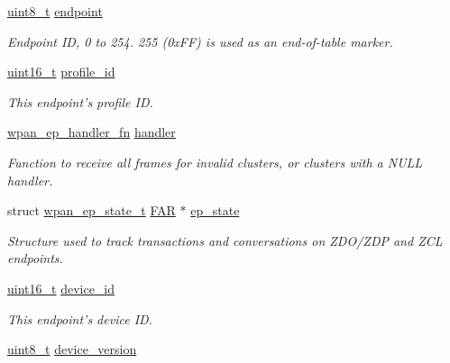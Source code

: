 \begin{DoxyCompactItemize}
\item 
\hypertarget{group__wpan__aps_ga7d397493728da2bca8d55b2d61c4ec5d}{\hyperlink{group__hal_gae1affc9ca37cfb624959c866a73f83c2}{uint8\-\_\-t} \hyperlink{group__wpan__aps_ga7d397493728da2bca8d55b2d61c4ec5d}{endpoint}}\label{group__wpan__aps_ga7d397493728da2bca8d55b2d61c4ec5d}

\begin{DoxyCompactList}\small\item\em Endpoint I\-D, 0 to 254. 255 (0x\-F\-F) is used as an end-\/of-\/table marker. \end{DoxyCompactList}\item 
\hyperlink{group__hal_ga5a8b2dc9e45a9ee81a94ef304fb62505}{uint16\-\_\-t} \hyperlink{group__wpan__aps_ga5ca7f19e5697de2baf0e2147a41a5792}{profile\-\_\-id}
\begin{DoxyCompactList}\small\item\em This endpoint's profile I\-D. \end{DoxyCompactList}\item 
\hyperlink{group__wpan__aps_ga8e6fcd1bdbf3808368a330b9fea021e4}{wpan\-\_\-ep\-\_\-handler\-\_\-fn} \hyperlink{group__wpan__aps_ga4835da0b636ce07eedbf92aa2779a761}{handler}
\begin{DoxyCompactList}\small\item\em Function to receive all frames for invalid clusters, or clusters with a {\ttfamily N\-U\-L\-L} handler. \end{DoxyCompactList}\item 
struct \hyperlink{structwpan__ep__state__t}{wpan\-\_\-ep\-\_\-state\-\_\-t} \hyperlink{group__hal_gaef060b3456fdcc093a7210a762d5f2ed}{F\-A\-R} $\ast$ \hyperlink{group__wpan__aps_ga389966cb276b33004b14ee698c270347}{ep\-\_\-state}
\begin{DoxyCompactList}\small\item\em Structure used to track transactions and conversations on Z\-D\-O/\-Z\-D\-P and Z\-C\-L endpoints. \end{DoxyCompactList}\item 
\hypertarget{group__wpan__aps_gadc401e0e7465eda38f9444eeb6169a10}{\hyperlink{group__hal_ga5a8b2dc9e45a9ee81a94ef304fb62505}{uint16\-\_\-t} \hyperlink{group__wpan__aps_gadc401e0e7465eda38f9444eeb6169a10}{device\-\_\-id}}\label{group__wpan__aps_gadc401e0e7465eda38f9444eeb6169a10}

\begin{DoxyCompactList}\small\item\em This endpoint's device I\-D. \end{DoxyCompactList}\item 
\hypertarget{group__wpan__aps_ga0b8f4e315b56b3e3c53dea801ce92104}{\hyperlink{group__hal_gae1affc9ca37cfb624959c866a73f83c2}{uint8\-\_\-t} \hyperlink{group__wpan__aps_ga0b8f4e315b56b3e3c53dea801ce92104}{device\-\_\-version}}\label{group__wpan__aps_ga0b8f4e315b56b3e3c53dea801ce92104}


\end{DoxyCompactItemize}
